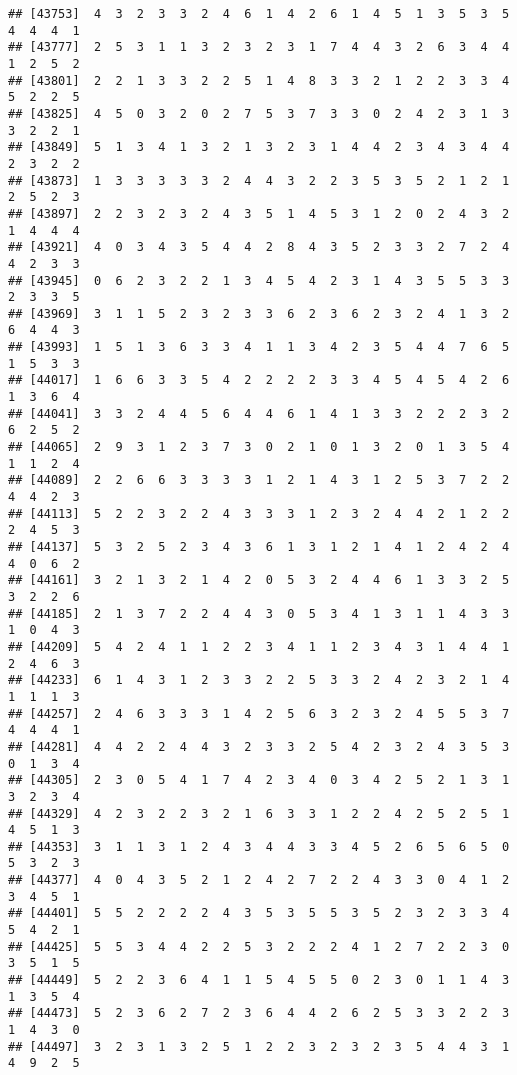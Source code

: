 \documentclass[
]{article}
\begin{document}
\begin{verbatim}
## [43753]  4  3  2  3  3  2  4  6  1  4  2  6  1  4  5  1  3  5  3  5  4  4  4  1
## [43777]  2  5  3  1  1  3  2  3  2  3  1  7  4  4  3  2  6  3  4  4  1  2  5  2
## [43801]  2  2  1  3  3  2  2  5  1  4  8  3  3  2  1  2  2  3  3  4  5  2  2  5
## [43825]  4  5  0  3  2  0  2  7  5  3  7  3  3  0  2  4  2  3  1  3  3  2  2  1
## [43849]  5  1  3  4  1  3  2  1  3  2  3  1  4  4  2  3  4  3  4  4  2  3  2  2
## [43873]  1  3  3  3  3  3  2  4  4  3  2  2  3  5  3  5  2  1  2  1  2  5  2  3
## [43897]  2  2  3  2  3  2  4  3  5  1  4  5  3  1  2  0  2  4  3  2  1  4  4  4
## [43921]  4  0  3  4  3  5  4  4  2  8  4  3  5  2  3  3  2  7  2  4  4  2  3  3
## [43945]  0  6  2  3  2  2  1  3  4  5  4  2  3  1  4  3  5  5  3  3  2  3  3  5
## [43969]  3  1  1  5  2  3  2  3  3  6  2  3  6  2  3  2  4  1  3  2  6  4  4  3
## [43993]  1  5  1  3  6  3  3  4  1  1  3  4  2  3  5  4  4  7  6  5  1  5  3  3
## [44017]  1  6  6  3  3  5  4  2  2  2  2  3  3  4  5  4  5  4  2  6  1  3  6  4
## [44041]  3  3  2  4  4  5  6  4  4  6  1  4  1  3  3  2  2  2  3  2  6  2  5  2
## [44065]  2  9  3  1  2  3  7  3  0  2  1  0  1  3  2  0  1  3  5  4  1  1  2  4
## [44089]  2  2  6  6  3  3  3  3  1  2  1  4  3  1  2  5  3  7  2  2  4  4  2  3
## [44113]  5  2  2  3  2  2  4  3  3  3  1  2  3  2  4  4  2  1  2  2  2  4  5  3
## [44137]  5  3  2  5  2  3  4  3  6  1  3  1  2  1  4  1  2  4  2  4  4  0  6  2
## [44161]  3  2  1  3  2  1  4  2  0  5  3  2  4  4  6  1  3  3  2  5  3  2  2  6
## [44185]  2  1  3  7  2  2  4  4  3  0  5  3  4  1  3  1  1  4  3  3  1  0  4  3
## [44209]  5  4  2  4  1  1  2  2  3  4  1  1  2  3  4  3  1  4  4  1  2  4  6  3
## [44233]  6  1  4  3  1  2  3  3  2  2  5  3  3  2  4  2  3  2  1  4  1  1  1  3
## [44257]  2  4  6  3  3  3  1  4  2  5  6  3  2  3  2  4  5  5  3  7  4  4  4  1
## [44281]  4  4  2  2  4  4  3  2  3  3  2  5  4  2  3  2  4  3  5  3  0  1  3  4
## [44305]  2  3  0  5  4  1  7  4  2  3  4  0  3  4  2  5  2  1  3  1  3  2  3  4
## [44329]  4  2  3  2  2  3  2  1  6  3  3  1  2  2  4  2  5  2  5  1  4  5  1  3
## [44353]  3  1  1  3  1  2  4  3  4  4  3  3  4  5  2  6  5  6  5  0  5  3  2  3
## [44377]  4  0  4  3  5  2  1  2  4  2  7  2  2  4  3  3  0  4  1  2  3  4  5  1
## [44401]  5  5  2  2  2  2  4  3  5  3  5  5  3  5  2  3  2  3  3  4  5  4  2  1
## [44425]  5  5  3  4  4  2  2  5  3  2  2  2  4  1  2  7  2  2  3  0  3  5  1  5
## [44449]  5  2  2  3  6  4  1  1  5  4  5  5  0  2  3  0  1  1  4  3  1  3  5  4
## [44473]  5  2  3  6  2  7  2  3  6  4  4  2  6  2  5  3  3  2  2  3  1  4  3  0
## [44497]  3  2  3  1  3  2  5  1  2  2  3  2  3  2  3  5  4  4  3  1  4  9  2  5

\end{verbatim}
\end{document}
